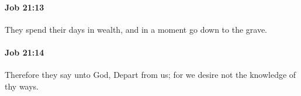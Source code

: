 		\paragraph{Job 21:13} %
			\label{JOB-21-13}

			They spend their days in wealth, and in a moment go down to the grave.


		\paragraph{Job 21:14} %
			\label{JOB-21-14}

			Therefore they say unto God, Depart from us; for we desire not the knowledge of thy ways.


